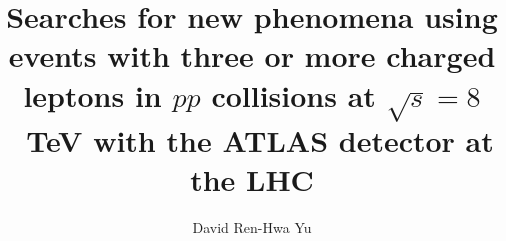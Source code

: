 \documentclass[english]{ucbthesis}
\begin{document}

\title{Searches for new phenomena using events with three or more charged leptons in $pp$ collisions at $\sqrt{s}=8$~TeV with the ATLAS detector at the LHC}
\author{David Ren-Hwa Yu}




\maketitle
\copyrightpage


\end{document}
